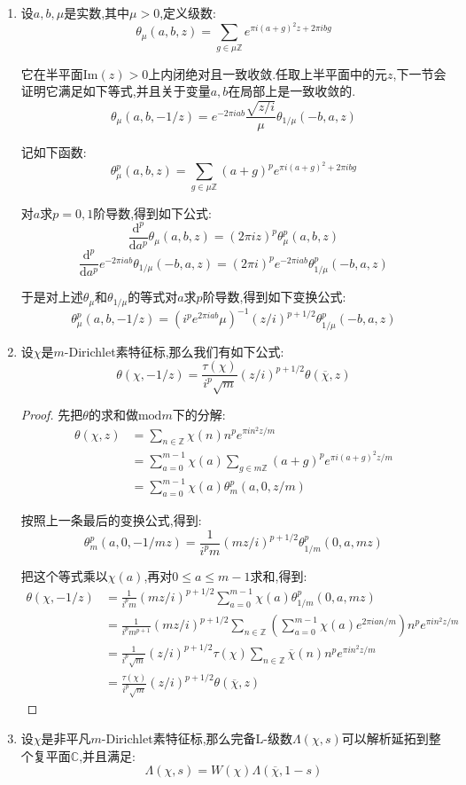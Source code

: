 \begin{enumerate}
\begin{proof}
        在$\mu=1$时对$v$求和是$m$,在$\mu\not=0$时这个求和是零是因为它们恰好是$X^m-1$的全部根.于是得到$|\tau(\chi)|^2=m$.
    \end{proof}
    \item 设$a,b,\mu$是实数,其中$\mu>0$,定义级数:
    $$\theta_{\mu}(a,b,z)=\sum_{g\in\mu\mathbb{Z}}e^{\pi i(a+g)^2z+2\pi ibg}$$
    
    它在半平面$\mathrm{Im}(z)>0$上内闭绝对且一致收敛.任取上半平面中的元$z$,下一节会证明它满足如下等式,并且关于变量$a,b$在局部上是一致收敛的.
    $$\theta_{\mu}(a,b,-1/z)=e^{-2\pi iab}\frac{\sqrt{z/i}}{\mu}\theta_{1/\mu}(-b,a,z)$$
    
    记如下函数:
    $$\theta_{\mu}^p(a,b,z)=\sum_{g\in\mu\mathbb{Z}}(a+g)^pe^{\pi i(a+g)^2+2\pi ibg}$$
    
    对$a$求$p=0,1$阶导数,得到如下公式:
    $$\frac{\mathrm{d}^p}{\mathrm{d}a^p}\theta_{\mu}(a,b,z)=(2\pi iz)^p\theta_{\mu}^p(a,b,z)$$
    $$\frac{\mathrm{d}^p}{\mathrm{d}a^p}e^{-2\pi iab}\theta_{1/\mu}(-b,a,z)=(2\pi i)^pe^{-2\pi iab}\theta_{1/\mu}^p(-b,a,z)$$
    
    于是对上述$\theta_{\mu}$和$\theta_{1/\mu}$的等式对$a$求$p$阶导数,得到如下变换公式:
    $$\theta_{\mu}^p(a,b,-1/z)=\left(i^pe^{2\pi iab}\mu\right)^{-1}(z/i)^{p+1/2}\theta_{1/\mu}^p(-b,a,z)$$
    \item 设$\chi$是$m$-Dirichlet素特征标,那么我们有如下公式:
    $$\theta(\chi,-1/z)=\frac{\tau(\chi)}{i^p\sqrt{m}}(z/i)^{p+1/2}\theta(\overline{\chi},z)$$
    \begin{proof}
    	
    	先把$\theta$的求和做$\mathrm{mod}m$下的分解:
    	\begin{align*}
    		\theta(\chi,z)&=\sum_{n\in\mathbb{Z}}\chi(n)n^pe^{\pi i n^2z/m}\\&=\sum_{a=0}^{m-1}\chi(a)\sum_{g\in m\mathbb{Z}}(a+g)^pe^{\pi i(a+g)^2z/m}\\&=\sum_{a=0}^{m-1}\chi(a)\theta_m^p(a,0,z/m)
    	\end{align*}
    	
    	按照上一条最后的变换公式,得到:
    	$$\theta_m^p(a,0,-1/mz)=\frac{1}{i^pm}(mz/i)^{p+1/2}\theta_{1/m}^p(0,a,mz)$$
    	
    	把这个等式乘以$\chi(a)$,再对$0\le a\le m-1$求和,得到:
    	\begin{align*}
    		\theta(\chi,-1/z)&=\frac{1}{i^pm}(mz/i)^{p+1/2}\sum_{a=0}^{m-1}\chi(a)\theta_{1/m}^p(0,a,mz)\\&=\frac{1}{i^pm^{p+1}}(mz/i)^{p+1/2}\sum_{n\in\mathbb{Z}}\left(\sum_{a=0}^{m-1}\chi(a)e^{2\pi ian/m}\right)n^pe^{\pi in^2z/m}\\&=\frac{1}{i^p\sqrt{m}}(z/i)^{p+1/2}\tau(\chi)\sum_{n\in\mathbb{Z}}\overline{\chi}(n)n^pe^{\pi in^2z/m}\\&=\frac{\tau(\chi)}{i^p\sqrt{m}}(z/i)^{p+1/2}\theta(\overline{\chi},z)
    	\end{align*}
    \end{proof}
    \item 设$\chi$是非平凡$m$-Dirichlet素特征标,那么完备L-级数$\Lambda(\chi,s)$可以解析延拓到整个复平面$\mathbb{C}$,并且满足:
    $$\Lambda(\chi,s)=W(\chi)\Lambda(\overline{\chi},1-s)$$
    

\end{enumerate}
